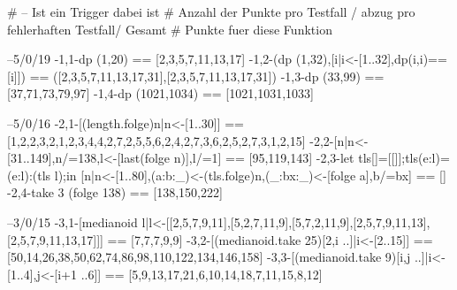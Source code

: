 
# -- Ist ein Trigger dabei ist
# Anzahl der Punkte pro Testfall / abzug pro fehlerhaften Testfall/ Gesamt
# Punkte fuer diese Funktion


--5/0/19
{-1,1-}dp (1,20) == [2,3,5,7,11,13,17]
{-1,2-}(dp (1,32),[i|i<-[1..32],dp(i,i)==[i]]) == ([2,3,5,7,11,13,17,31],[2,3,5,7,11,13,17,31])
{-1,3-}dp (33,99) == [37,71,73,79,97]
{-1,4-}dp (1021,1034) == [1021,1031,1033]

--5/0/16
{-2,1-}[(length.folge)n|n<-[1..30]] == [1,2,2,3,2,1,2,3,4,4,2,7,2,5,5,6,2,4,2,7,3,6,2,5,2,7,3,1,2,15]
{-2,2-}[n|n<-[31..149],n/=138,l<-[last(folge n)],l/=1] == [95,119,143]
{-2,3-}let tls[]=[[]];tls(e:l)=(e:l):(tls l);in [n|n<-[1..80],(a:b:_)<-(tls.folge)n,(_:bx:_)<-[folge a],b/=bx] == []
{-2,4-}take 3 (folge 138) == [138,150,222]

--3/0/15
{-3,1-}[medianoid l|l<-[[2,5,7,9,11],[5,2,7,11,9],[5,7,2,11,9],[2,5,7,9,11,13],[2,5,7,9,11,13,17]]] == [7,7,7,9,9]
{-3,2-}[(medianoid.take 25)[2,i ..]|i<-[2..15]] == [50,14,26,38,50,62,74,86,98,110,122,134,146,158]
{-3,3-}[(medianoid.take 9)[i,j ..]|i<-[1..4],j<-[i+1 ..6]] == [5,9,13,17,21,6,10,14,18,7,11,15,8,12]

